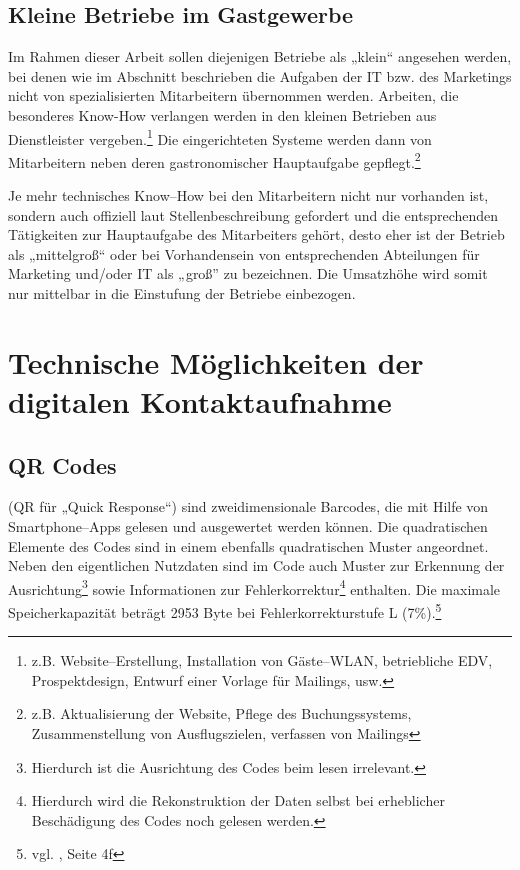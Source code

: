 \subsection{Kleine Betriebe im Gastgewerbe} %
\label{sub:kleine_betriebe_im_gastgewerbe}
Im Rahmen dieser Arbeit sollen diejenigen Betriebe als „klein“ angesehen werden, bei denen wie im Abschnitt  beschrieben die Aufgaben der IT bzw. des Marketings nicht von spezialisierten Mitarbeitern übernommen werden. Arbeiten, die besonderes Know-How verlangen werden in den kleinen Betrieben aus Dienstleister vergeben.\footnote{z.B. Website–Erstellung, Installation von Gäste–WLAN, betriebliche EDV, Prospektdesign, Entwurf einer Vorlage für Mailings, usw.} Die eingerichteten Systeme werden dann von Mitarbeitern neben deren gastronomischer Hauptaufgabe gepflegt.\footnote{z.B. Aktualisierung der Website, Pflege des Buchungssystems, Zusammenstellung von Ausflugszielen, verfassen von Mailings}

Je mehr technisches Know–How bei den Mitarbeitern nicht nur vorhanden ist, sondern auch offiziell laut Stellenbeschreibung gefordert und die entsprechenden Tätigkeiten zur Hauptaufgabe des Mitarbeiters gehört, desto eher ist der Betrieb als „mittelgroß“ oder bei Vorhandensein von entsprechenden Abteilungen für Marketing und/oder IT als „groß” zu bezeichnen. Die Umsatzhöhe wird somit nur mittelbar in die Einstufung der Betriebe einbezogen.


\newpage
\section{Technische Möglichkeiten der digitalen Kontaktaufnahme} %
\label{sec:technologien}

\subsection{QR Codes} %
\label{sub:qr_codes}
 (QR für „Quick Response“) sind zweidimensionale Barcodes, die mit Hilfe von Smartphone–Apps gelesen und ausgewertet werden können. Die quadratischen Elemente des Codes sind in einem ebenfalls quadratischen Muster angeordnet. Neben den eigentlichen Nutzdaten sind im Code auch Muster zur Erkennung der Ausrichtung\footnote{Hierdurch ist die Ausrichtung des Codes beim lesen irrelevant.} sowie Informationen zur Fehlerkorrektur\footnote{Hierdurch wird die Rekonstruktion der Daten selbst bei erheblicher Beschädigung des Codes noch gelesen werden.} enthalten. Die maximale Speicherkapazität beträgt 2953 Byte bei Fehlerkorrekturstufe L (7\%).\footnote{vgl. \cite{iso18004}, Seite 4f}

